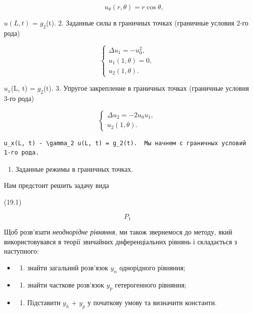 \documentclass[
  ukrainian,
]{article}
\providecommand{\tightlist}{%
  \setlength{\itemsep}{0pt}\setlength{\parskip}{0pt}}
\begin{document}
\[
\qquad u_{\theta}(r, \theta) = r \cos \theta,
\]

\(u(L, t)\) = \(g_2\)(t). 2. Заданные силы в граничных точках (граничные
условия 2-го рода)

\[
\begin{cases} \Delta u_{1} = -u_{0}^{2}, \\ u_{1}(1, \theta) = 0, \\ u_{2}(1, \theta). \end{cases}
\]

\(u_x\)(L, t) = \(g_2\)(t). 3. Упругое закрепление в граничных точках
(граничные условия 3-го рода)

\[
\begin{cases} \Delta u_{2} = -2u_{0}u_{1}, \\ u_{2}(1, \theta). \end{cases}
\]

\begin{verbatim}
u_x(L, t) - \gamma_2 u(L, t) = g_2(t).  Мы начнем с граничных условий 1-го рода.
\end{verbatim}

\begin{enumerate}
\def\labelenumi{\arabic{enumi}.}
\tightlist
\item
  Заданные режимы в граничных точках.
\end{enumerate}

Нам предстоит решить задачу вида

(19.1)

\[
P_{1}
\]

Щоб розв'язати \emph{неоднорідне рівняння}, ми також звернемося до
методу, який використовувався в теорії звичайних диференціальних рівнянь
і складається з наступного:

\begin{itemize}
\tightlist
\item
  \begin{enumerate}
  \def\labelenumi{\arabic{enumi})}
  \tightlist
  \item
    знайти загальний розв'язок \(y_n\) однорідного рівняння;
  \end{enumerate}
\item
  \begin{enumerate}
  \def\labelenumi{\arabic{enumi})}
  \setcounter{enumi}{1}
  \tightlist
  \item
    знайти часткове розв'язок \(y_p\) гетерогенного рівняння;
  \end{enumerate}
\item
  \begin{enumerate}
  \def\labelenumi{\arabic{enumi})}
  \setcounter{enumi}{2}
  \tightlist
  \item
    Підставити \(y_h\) + \(y_p\) у початкову умову та визначити
    константи.
  \end{enumerate}
\end{itemize}
\end{document}
